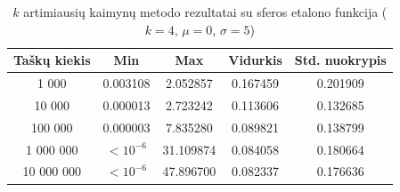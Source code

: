 \begin{table}[H]
    \centering
    \begin{tabular}{|c|c|c|c|c|}
        \hline
        \textbf{Taškų kiekis} & \textbf{Min} & \textbf{Max} & \textbf{Vidurkis} & \textbf{Std. nuokrypis} \\ \hline
        1 000        & 0.003108 & 2.052857 & 0.167459 & 0.201909 \\ \hline
        10 000       & 0.000013 & 2.723242 & 0.113606 & 0.132685 \\ \hline
        100 000      & 0.000003 & 7.835280 & 0.089821 & 0.138799 \\ \hline
        1 000 000    & $<10^{-6}$ & 31.109874 & 0.084058 & 0.180664 \\ \hline
        10 000 000   & $<10^{-6}$ & 47.896700 & 0.082337 & 0.176636 \\ \hline
    \end{tabular}
    \caption{$k$ artimiausių kaimynų metodo rezultatai su sferos etalono funkcija ($k = 4$, $\mu = 0$, $\sigma = 5$)}
\end{table}